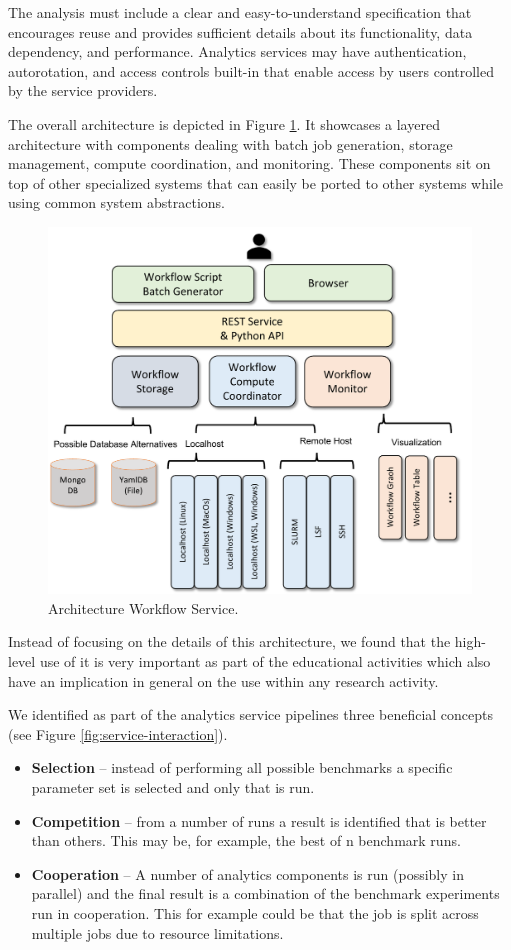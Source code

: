 \documentclass[utf8]{FrontiersinVancouver} %
\begin{document}
The analysis must include a clear and easy-to-understand specification
that encourages reuse and provides sufficient details about its
functionality, data dependency, and performance. Analytics services
may have authentication, autorotation, and access controls built-in
that enable access by users controlled by the service providers.

The overall architecture is depicted in Figure \ref{fig:cc-2}. It
showcases a layered architecture with components dealing with batch job
generation, storage management, compute coordination, and
monitoring. These components sit on top of other specialized systems
that can easily be ported to other systems while using common system
abstractions.

\begin{figure}[htb]
    \centering
    \includegraphics[width=0.70\columnwidth]{images/cloudmesh-cc-new.pdf}
    \caption{Architecture Workflow Service.}
    \label{fig:cc-2}
\end{figure}

Instead of focusing on the details of this architecture, we found that
the high-level use of it is very important as part of the educational
activities which also have an implication in general on the use within
any research activity.

We identified as part of the  analytics service pipelines
three beneficial concepts (see Figure \ref{fig:service-interaction}).

\begin{itemize}
\item {\bf Selection} -- instead of performing all possible benchmarks a
  specific parameter set is selected and only that is run.  
\item {\bf Competition} -- from a number of runs a result is identified that is better than others. This
  may be, for example, the best of n benchmark runs.
\item {\bf Cooperation} -- A number of analytics components is run
  (possibly in parallel) and the final result is a combination of the
  benchmark experiments run in cooperation. This for example could be
  that the job is split across multiple jobs due to resource
  limitations.
\end{itemize}
\end{document}
